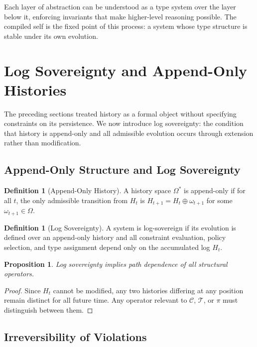 \documentclass[12pt, a4paper]{article}
\theoremstyle{plain}
\newtheorem{proposition}[theorem]{Proposition}
\theoremstyle{definition}
\newtheorem{definition}[theorem]{Definition}
\theoremstyle{remark}
\begin{document}
Each layer of abstraction can be understood as a type system over the layer below it, enforcing invariants that make higher-level reasoning possible. The compiled self is the fixed point of this process: a system whose type structure is stable under its own evolution.

\section{Log Sovereignty and Append-Only Histories}

The preceding sections treated history as a formal object without specifying constraints on its persistence. We now introduce log sovereignty: the condition that history is append-only and all admissible evolution occurs through extension rather than modification.

\subsection{Append-Only Structure and Log Sovereignty}

\begin{definition}[Append-Only History]
A history space $\Omega^*$ is append-only if for all $t$, the only admissible transition from $H_t$ is $H_{t+1} = H_t \oplus \omega_{t+1}$ for some $\omega_{t+1} \in \Omega$.
\end{definition}

\begin{definition}[Log Sovereignty]
A system is log-sovereign if its evolution is defined over an append-only history and all constraint evaluation, policy selection, and type assignment depend only on the accumulated log $H_t$.
\end{definition}

\begin{proposition}
Log sovereignty implies path dependence of all structural operators.
\end{proposition}

\begin{proof}
Since $H_t$ cannot be modified, any two histories differing at any position remain distinct for all future time. Any operator relevant to $\mathcal{C}$, $\mathcal{T}$, or $\pi$ must distinguish between them.
\end{proof}

\subsection{Irreversibility of Violations}
\end{document}
